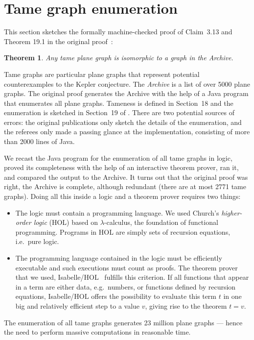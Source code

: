 \documentclass[11pt]{amsart}
\newtheorem{thm}{Theorem}
\begin{document}
\section{Tame graph enumeration}

\label{sec:graph}

This section sketches the formally machine-checked proof of Claim~3.13 and
Theorem 19.1 in the original proof~\cite{Hales:2006:DCG}:
\begin{thm}\label{Archive:complete}
Any tame plane graph is isomorphic to a graph in the Archive.
\end{thm}
Tame graphs are particular plane graphs that represent potential
counterexamples to the Kepler conjecture. The \emph{Archive} is a list of over 5000 plane
graphs.  The original proof generates the Archive with the help of a Java program that
enumerates all plane graphs. Tameness is defined
in Section~18 and the enumeration is sketched in Section~19 of
\cite{Hales:2006:DCG}. There are two potential sources of errors:
the original publications only sketch the details of the enumeration, and the
referees only made a passing glance at the implementation, consisting of more than 2000
lines of Java.

We recast the Java program for the enumeration of all tame graphs in
logic, proved its completeness with the help of an interactive theorem prover,
ran it, and compared the output to the
Archive.  It turns out that the original proof was right, the Archive is complete,
although redundant (there are at most 2771 tame graphs).
Doing all this inside a logic and a theorem prover requires two things:
\begin{itemize}
\item The logic must contain a programming language.
We used Church's \emph{higher-order logic} (HOL) based on $\lambda$-calculus,
the foundation of functional programming. Programs in HOL are simply
sets of recursion equations, i.e.\ pure logic.
\item The programming language contained in the logic must be efficiently
executable and such executions must count as proofs. The theorem prover that we used, Isabelle/HOL~\cite{LNCS2283} fulfills this criterion. If all functions
that appear in a term are either data, e.g.\ numbers, or functions defined
by recursion equations, Isabelle/HOL offers the possibility to evaluate this term $t$ in one big and relatively efficient step to a value $v$, giving rise to the theorem $t = v$.
\end{itemize}
The enumeration of all tame graphs generates 23 million plane graphs ---
hence the need to perform massive computations in reasonable time.
\end{document}
